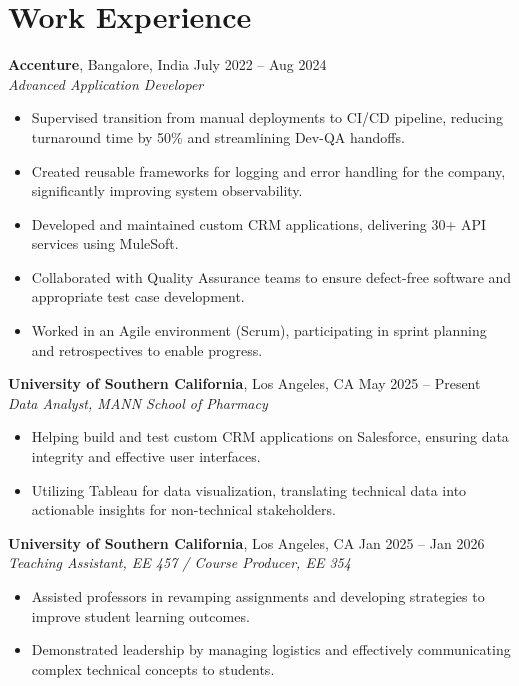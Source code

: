 \documentclass[letterpaper,10pt]{article}
\begin{document}
\section*{Work Experience}
\textbf{Accenture}, Bangalore, India \hfill July 2022 -- Aug 2024 \\
\textit{Advanced Application Developer}
\begin{itemize}
    \item Supervised transition from manual deployments to CI/CD pipeline, reducing turnaround time by 50\% and streamlining Dev-QA handoffs.
    \item Created reusable frameworks for logging and error handling for the company, significantly improving system observability.
    \item Developed and maintained custom CRM applications, delivering 30+ API services using MuleSoft.
    \item Collaborated with Quality Assurance teams to ensure defect-free software and appropriate test case development.
    \item Worked in an Agile environment (Scrum), participating in sprint planning and retrospectives to enable progress.
\end{itemize}

\textbf{University of Southern California}, Los Angeles, CA \hfill May 2025 -- Present \\
\textit{Data Analyst, MANN School of Pharmacy}
\begin{itemize}
    \item Helping build and test custom CRM applications on Salesforce, ensuring data integrity and effective user interfaces.
    \item Utilizing Tableau for data visualization, translating technical data into actionable insights for non-technical stakeholders.
\end{itemize}

\textbf{University of Southern California}, Los Angeles, CA \hfill Jan 2025 -- Jan 2026 \\
\textit{Teaching Assistant, EE 457 / Course Producer, EE 354}
\begin{itemize}
    \item Assisted professors in revamping assignments and developing strategies to improve student learning outcomes.
    \item Demonstrated leadership by managing logistics and effectively communicating complex technical concepts to students.
\end{itemize}
\end{document}
